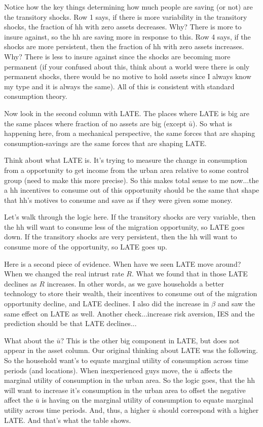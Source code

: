 \documentclass[pdftex,11pt]{article}
\begin{document}
Notice how the key things determining how much people are saving (or not) are the transitory shocks. Row 1 says, if there is more variability in the transitory shocks, the fraction of hh with zero assets decreases. Why? There is more to insure against, so the hh are saving more in response to this.  Row 4 says, if the shocks are more persistent, then the fraction of hh with zero assets increases. Why? There is less to insure against since the shocks are becoming more permanent (if your confused about this, think about a world were there is only permanent shocks, there would be no motive to hold assets since I always know my type and it is always the same). All of this is consistent with standard consumption theory.

Now look in the second column with LATE. The places where LATE is big are the same places where fraction of no assets are big (except $\bar u$). So what is happening here, from a mechanical perspective, the same forces that are shaping consumption-savings are the same forces that are shaping LATE.

Think about what LATE is. It's trying to measure the change in consumption from a opportunity to get income from the urban area relative to some control group (need to make this more precise). So this makes total sense to me now...the a hh incentives to consume out of this opportunity should be the same that shape that hh's motives to consume and save as if they were given some money.

Let's walk through the logic here. If the transitory shocks are very variable, then the hh will want to consume less of the migration opportunity, so LATE goes down. If the transitory shocks are very persistent, then the hh will want to consume more of the opportunity, so LATE goes up.

Here is a second piece of evidence. When have we seen LATE move around? When we changed the real intrust rate $R$. What we found that in those LATE declines as $R$ increases. In other words, as we gave households a better technology to store their wealth, their incentives to consume out of the migration opportunity decline, and LATE declines. I also did the increase in $\beta$ and saw the same effect on LATE as well. Another check...increase risk aversion, IES and the prediction should be that LATE declines...

What about the $\bar u$? This is the other big component in LATE, but does not appear in the asset column. Our original thinking about LATE was the following. So the household want's to equate marginal utility of consumption across time periods (and locations). When inexperienced guys move, the $\bar u$ affects the marginal utility of consumption in the urban area. So the logic goes, that the hh will want to increase it's consumption in the urban area to offset the negative affect the $\bar u$ is having on the marginal utility of consumption to equate marginal utility across time periods. And, thus, a higher $\bar u$ should correspond with a higher LATE. And that's what the table shows.
\end{document}
